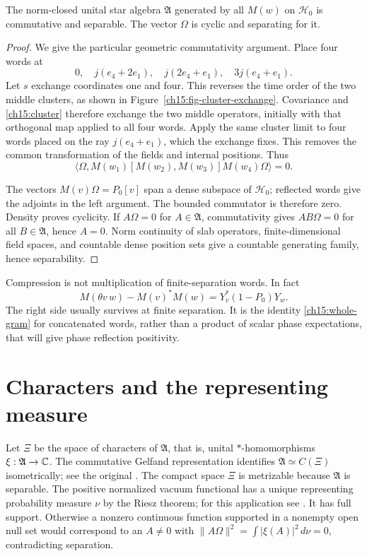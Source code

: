 \begin{proposition}
\label{ch15:algebra}
The norm-closed unital star algebra $\mathfrak A$ generated by all
$M(w)$ on $\mathcal H_0$ is commutative and separable. The vector
$\Omega$ is cyclic and separating for it.
\end{proposition}
\begin{proof}
We give the particular geometric commutativity argument. Place four
words at
\[
 0,\quad j(e_4+2e_1),\quad j(2e_4+e_1),\quad3j(e_4+e_1).
\]
Let $s$ exchange coordinates one and four. This reverses the time order
of the two middle clusters, as shown in Figure~\ref{ch15:fig-cluster-exchange}.
Covariance and \eqref{ch15:cluster} therefore exchange
the two middle operators, initially with that orthogonal map applied
to all four words. Apply the same cluster limit to four words placed
on the ray $j(e_4+e_1)$, which the exchange fixes. This removes the
common transformation of the fields and internal positions. Thus
\[
 \langle\Omega,M(w_1)[M(w_2),M(w_3)]M(w_4)\Omega\rangle=0.
\]

The vectors $M(v)\Omega=P_0[v]$ span a dense subspace of $\mathcal H_0$;
reflected words give the adjoints in the left argument. The bounded
commutator is therefore zero. Density proves cyclicity. If
$A\Omega=0$ for $A\in\mathfrak A$, commutativity gives $AB\Omega=0$
for all $B\in\mathfrak A$, hence $A=0$. Norm continuity of slab
operators, finite-dimensional field spaces, and countable dense
position sets give a countable generating family, hence separability.
\end{proof}

Compression is not multiplication of finite-separation words. In fact
\begin{equation}
 M(\theta v\,w)-M(v)^*M(w)=Y_v^*(1-P_0)Y_w.
 \label{ch15:compression-defect}
\end{equation}
The right side usually survives at finite separation. It is the
identity \eqref{ch15:whole-gram} for concatenated words, rather than a product of
scalar phase expectations, that will give phase reflection positivity.

\FloatBarrier
\section{Characters and the representing measure}
\label{ch15:characters}

Let $\Xi$ be the space of characters of $\mathfrak A$, that is,
unital $*$-homomorphisms $\xi:\mathfrak A\to\mathbb C$.
The commutative Gelfand representation identifies
$\mathfrak A\simeq C(\Xi)$ isometrically; see the original
\cite[Section~2, Lemma~1]{GelfandNaimark1943}. The compact space $\Xi$
is metrizable because $\mathfrak A$ is separable. The positive normalized
vacuum functional has a unique representing probability measure
$\nu$ by the Riesz theorem; for this application see
\cite[Theorems~2.4.1 and~2.8.2]{Landsman1998}.
It has full support. Otherwise a nonzero continuous function supported
in a nonempty open null set would correspond to an $A\ne0$ with
$\|A\Omega\|^2=\int|\xi(A)|^2\,d\nu=0$, contradicting separation.

